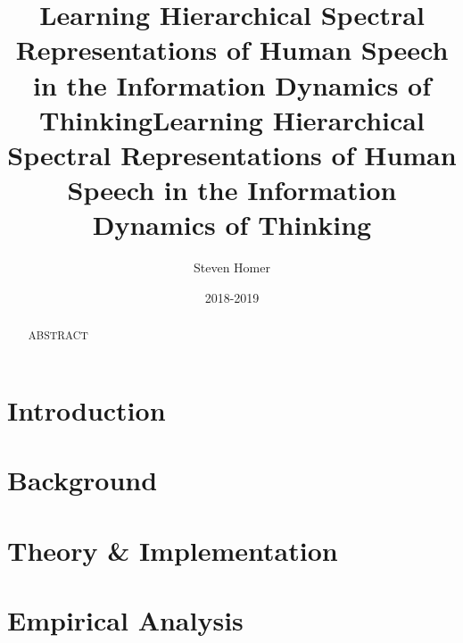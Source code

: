 \documentclass[12pt]{report}
\title{Learning Hierarchical Spectral Representations of Human Speech in the Information Dynamics of Thinking}
\author{Steven Homer}
\date{2018-2019}
\begin{document}
\maketitle

\title{Learning Hierarchical Spectral Representations of Human Speech in the Information Dynamics of Thinking}
\maketitle

\begin{abstract}
  ABSTRACT
\end{abstract}

\clearpage
\tableofcontents
\clearpage

\chapter{Introduction}




\chapter{Background}





\chapter{Theory \& Implementation}





\chapter{Empirical Analysis}


\end{document}
